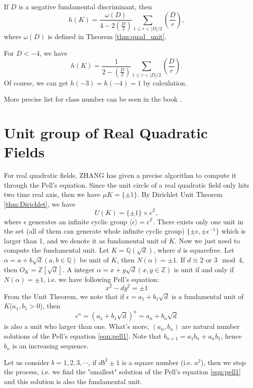 \begin{theorem}
If $D$ is a negative fundamental discriminant, then $$h(K)=\frac{\omega(D)}{4-2\left(\frac{D}{2}\right)}\sum_{1\leq r<|D|/2}\left(\frac{D}{r}\right),$$ where $\omega(D)$ is defined in Theorem \ref{thm:quad_unit}. 
\end{theorem} 

\begin{remark}
For $D<-4$, we have $$h(K)=\frac{1}{2-\left(\frac{D}{2}\right)}\sum_{1\leq r<|D|/2}\left(\frac{D}{r}\right).$$ Of course, we can get $h(-3)=h(-4)=1$ by calculation. 
\end{remark}
More precise list for class number can be seen in the book \citep{Xianke2006ANT}.

\section{Unit group of Real Quadratic Fields}
For real quadratic fields, ZHANG \citep{Xianke2006ANT} has given a precise algorithm to compute it through the Pell's equation. Since the unit circle of a real quadratic field only hits two time real axis, then we have $\mu{K}=\{\pm1\}$. By Dirichlet Unit Theorem \ref{thm:Dirichlet}, we have $$U(K)=\{\pm1\}\times \epsilon^{\mathbb{Z}},$$ where $\epsilon$ generates an infinite cyclic group $\langle\epsilon\rangle=\epsilon^{\mathbb{Z}}$. There exists only one unit in the set (all of them can generate whole infinite cyclic group) $\{\pm\epsilon,\pm\epsilon^{-1}\}$ which is larger than 1, and we denote it as fundamental unit of $K$. 
Now we just need to compute the fundamental unit. Let $K=\mathbb{Q}(\sqrt{d})$, where $d$ is squarefree. Let $\alpha=a+b\sqrt{d}(a,b\in\mathbb{Q})$ be unit of $K$, then $N(\alpha)=\pm1$. 
If $d\equiv 2 \text{ or }3 \mod 4$, then $O_K=\mathbb{Z}[\sqrt{d}]$. A integer $\alpha=x+y\sqrt{d}(x,y\in\mathbb{Z})$ is unit if and only if $N(\alpha)=\pm1$, i.e. we have following Pell's equation:
\begin{equation}\label{eqn:pell1}
x^2-d y^2=\pm1
\end{equation} 
From the Unit Theorem, we note that if $\epsilon=a_1+b_1\sqrt{d}$ is a fundamental unit of $K$($a_1,b_1>0$), then $$\epsilon^n=(a_1+b_1\sqrt{d})^n=a_n+b_n\sqrt{d}$$ is also a unit who larger than one. What's more, $(a_n,b_n)$ are natural number solutions of the Pell's equation \ref{eqn:pell1}. Note that $b_{n+1}=a_1b_n+a_nb_1$, hence $b_n$ is an increasing sequence.

Let us consider $b=1,2,3,\cdots$, if $d b^2\pm1$ is a square number (i.e. $a^2$), then we stop the process, i.e. we find the "smallest" solution of the Pell's equation \ref{eqn:pell1} and this solution is also the fundamental unit.

